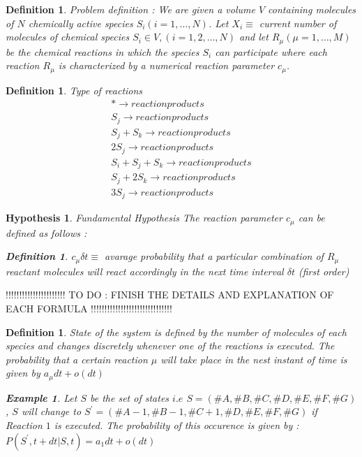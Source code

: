 \documentclass[11pt,a4paper]{article}
\newtheorem{defn}[theorem]{Definition}
\newtheorem{example}[theorem]{Example}
\newtheorem{hyp}[theorem]{Hypothesis}
\begin{document}
\begin{defn}{Problem definition : }
We are given a volume $V$ containing molecules of $N$ chemically active species $S_{i}(i = 1, \dots, N)$. Let $X_{i} \equiv$ current number of molecules of chemical species $S_{i} \in V, (i = 1, 2, \dots, N)$ and let $R_{\mu} (\mu = 1, \dots, M)$ be the chemical reactions in which the species $S_{i}$ can participate where each reaction $R_{\mu}$ is characterized by a numerical reaction parameter $c_{\mu}$.
\end{defn}
\begin{defn}{Type of reactions}
\begin{gather}
  {* \rightarrow reaction products}  \\
  {S_{j} \rightarrow reaction products} \\
  {S_{j} + S_{k} \rightarrow reaction products}\\
  {2S_{j} \rightarrow reaction products} \\
  {S_{i} + S_{j} + S_{k} \rightarrow reaction products}\\
  {S_{j} + 2S_{k} \rightarrow reaction products} \\
  {3S_{j} \rightarrow reaction products}
\end{gather}
\end{defn}

\begin{hyp}{Fundamental Hypothesis}
The reaction parameter $c_{\mu}$ can be defined as follows :
\begin{defn} $c_{\mu} \delta t \equiv $ avarage probability that a particular combination of $R_{\mu}$ reactant molecules will react accordingly in the next time interval $\delta t$ (first order)
\end{defn}
\end{hyp}

!!!!!!!!!!!!!!!!!!!!!! TO DO : FINISH THE DETAILS AND EXPLANATION OF EACH FORMULA !!!!!!!!!!!!!!!!!!!!!!!!!!!!!!

\begin{defn}State of the system is defined by the number of molecules of each species and changes discretely whenever one of the reactions is executed. The probability that a certain reaction $\mu$ will take place in the nest instant of time is given by $a_{\mu}dt + o(dt)$

  \begin{example} Let $S$ be the set of states $i.e$ $S = (\#A, \#B, \#C, \#D, \#E, \#F, \#G)$, $S$ will change to $S^{'} = (\#A-1, \#B-1, \#C+1, \#D, \#E, \#F, \#G)$ if Reaction $1$ is executed. The probability of this occurence is given by :
  $P(S^{'}, t + dt|S,t) = a_{1}dt + o(dt)$
  \end{example}

\end{defn}
\end{document}
